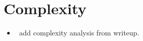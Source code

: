 \section{Complexity}

\begin{itemize}
\item \TODO\ add complexity analysis from writeup.
\end{itemize}

